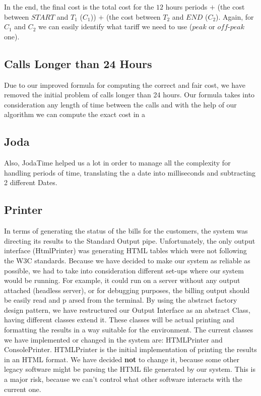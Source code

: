 \documentclass[11pt,twocolumn]{article} %
\begin{document}
In the end, the final cost is the total cost for the $12$ hours periods $+$ (the cost between $START$ and $T_1$ ($C_1$)) $+$ (the cost between $T_2$ and $END$ ($C_2$). 
Again, for $C_1$ and $C_2$ we can easily identify what tariff we need to use ($peak$ or $off$-$peak$ one).

\subsection{Calls Longer than 24 Hours}

Due to our improved formula for computing the correct and fair cost, we have removed the initial problem 
of calls longer than 24 hours. Our formula takes into consideration any length of time between the calls and 
with the help of our algorithm we can compute the exact cost in a 


\subsection{Joda}
Also, JodaTime helped us a lot in order to manage all the complexity for handling periods of time,
translating the a date into milliseconds and subtracting 2 different Dates. 

\subsection{Printer}
In terms of generating the status of the bills for the customers, the system was directing its results to the Standard Output pipe. 
Unfortunately, the only output interface (HtmlPrinter) was generating HTML tables which were not following the W3C standards. 
Because we have decided to make our system as reliable as possible, we had to take into consideration different set-ups where our system would be running. 
For example, it could run on a server without any output attached (headless server), or for debugging purposes, 
the billing output should be easily read and p arsed from the terminal. 
By using the abstract factory design pattern, we have restructured our Output Interface as an abstract Class, 
having different classes extend it. These classes will be actual printing and formatting the results in a way suitable for the environment.
The current classes we have implemented or changed in the system are: HTMLPrinter and ConsolePrinter. HTMLPrinter is the initial implementation 
of printing the results in an HTML format. We have decided \textbf{not} to change it, because some other legacy software might be parsing the
HTML file generated by our system. This is a major risk, because we can't control what other software interacts with the current one.
\end{document}
